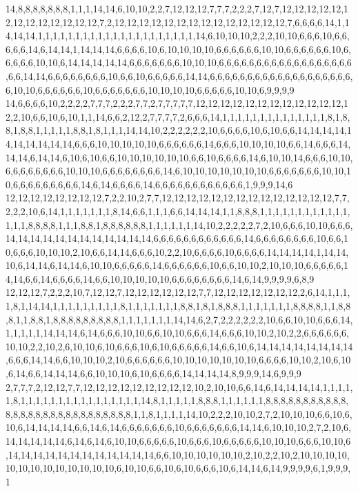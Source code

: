 14,8,8,8,8,8,8,8,1,1,1,14,14,6,10,10,2,2,7,12,12,12,7,7,7,2,2,2,7,12,7,12,12,12,12,12,12,12,12,12,12,12,12,12,7,2,12,12,12,12,12,12,12,12,12,12,12,12,12,12,7,6,6,6,6,14,1,14,14,14,1,1,1,1,1,1,1,1,1,1,1,1,1,1,1,1,1,1,1,1,1,14,6,10,10,10,2,2,2,10,10,6,6,6,10,6,6,6,6,6,14,6,14,14,1,14,14,14,6,6,6,6,10,6,10,10,10,10,6,6,6,6,6,6,10,10,6,6,6,6,6,6,10,6,6,6,6,6,10,10,6,14,14,14,14,14,6,6,6,6,6,6,6,10,10,10,6,6,6,6,6,6,6,6,6,6,6,6,6,6,6,6,6,6,6,6,14,14,6,6,6,6,6,6,6,6,10,6,6,10,6,6,6,6,6,14,14,6,6,6,6,6,6,6,6,6,6,6,6,6,6,6,6,6,6,6,6,10,10,6,6,6,6,6,6,10,6,6,6,6,6,6,6,10,10,10,10,6,6,6,6,6,10,10,6,9,9,9,9
14,6,6,6,6,10,2,2,2,2,7,7,7,2,2,2,7,7,2,7,7,7,7,7,12,12,12,12,12,12,12,12,12,12,12,12,12,2,10,6,6,10,6,10,1,1,14,6,6,2,12,2,7,7,7,7,2,6,6,6,14,1,1,1,1,1,1,1,1,1,1,1,1,1,1,8,1,8,8,1,8,8,1,1,1,1,1,8,8,1,8,1,1,1,14,14,10,2,2,2,2,2,2,10,6,6,6,6,10,6,10,6,6,14,14,14,14,14,14,14,14,14,14,6,6,6,10,10,10,10,10,6,6,6,6,6,6,14,6,6,6,10,10,10,10,6,6,14,6,6,6,14,14,14,6,14,14,6,10,6,10,6,6,10,10,10,10,10,10,6,6,10,6,6,6,6,14,6,10,10,14,6,6,6,10,10,6,6,6,6,6,6,6,6,10,10,10,6,6,6,6,6,6,6,6,14,6,10,10,10,10,10,10,10,6,6,6,6,6,6,6,10,10,10,6,6,6,6,6,6,6,6,6,14,6,14,6,6,6,6,14,6,6,6,6,6,6,6,6,6,6,6,6,1,9,9,9,14,6
12,12,12,12,12,12,12,12,7,2,2,10,2,7,7,12,12,12,12,12,12,12,12,12,12,12,12,12,12,7,7,2,2,2,10,6,14,1,1,1,1,1,1,1,8,14,6,6,1,1,1,6,6,14,14,14,1,1,8,8,8,1,1,1,1,1,1,1,1,1,1,1,1,1,1,1,8,8,8,8,1,1,1,8,8,1,8,8,8,8,8,8,1,1,1,1,1,1,14,10,2,2,2,2,2,7,2,10,6,6,6,10,10,6,6,6,14,14,14,14,14,14,14,14,14,14,14,14,6,6,6,6,6,6,6,6,6,6,6,6,14,6,6,6,6,6,6,6,6,10,6,6,10,6,6,6,10,10,10,2,10,6,6,14,14,6,6,6,10,2,2,10,6,6,6,6,10,6,6,6,6,14,14,14,14,1,14,14,10,6,14,14,6,14,14,6,10,10,6,6,6,6,6,14,6,6,6,6,6,6,10,6,6,10,10,2,10,10,10,6,6,6,6,6,14,14,6,6,14,6,6,6,6,14,6,6,10,10,10,10,10,6,6,6,6,6,6,6,6,14,6,14,9,9,9,9,6,8,9
12,12,12,7,2,2,2,10,7,12,12,7,12,12,12,12,12,12,7,7,12,12,12,12,12,12,12,2,6,14,1,1,1,1,8,1,14,14,1,1,1,1,1,1,1,1,1,8,1,1,1,1,1,1,1,8,8,1,8,1,8,8,8,1,1,1,1,1,1,1,8,8,8,8,1,1,8,8,8,1,1,8,8,1,8,8,8,8,8,8,8,8,8,1,1,1,1,1,1,1,14,14,6,2,7,2,2,2,2,2,2,10,6,6,10,10,6,6,6,14,1,1,1,1,1,14,14,14,6,14,6,6,6,10,10,6,6,10,10,6,6,6,14,6,6,6,10,10,2,10,2,2,6,6,6,6,6,6,10,10,2,2,10,2,6,10,10,6,10,6,6,6,10,6,10,6,6,6,6,6,14,6,6,10,6,14,14,14,14,14,14,14,14,6,6,6,14,14,6,6,10,10,10,2,10,6,6,6,6,6,6,10,10,10,10,10,10,10,6,6,6,6,10,10,2,10,6,10,6,14,6,6,14,14,14,6,6,10,10,10,6,10,6,6,6,6,14,14,14,14,8,9,9,9,14,6,9,9,9
2,7,7,7,2,12,12,7,7,12,12,12,12,12,12,12,12,12,10,2,10,10,6,6,14,6,14,14,14,14,1,1,1,1,1,8,1,1,1,1,1,1,1,1,1,1,1,1,1,1,1,1,14,8,1,1,1,1,1,8,8,8,1,1,1,1,1,1,8,8,8,8,8,8,8,8,8,8,8,8,8,8,8,8,8,8,8,8,8,8,8,8,8,8,8,8,1,1,8,1,1,1,1,14,10,2,2,2,10,10,2,7,2,10,10,10,6,6,10,6,10,6,14,14,14,14,6,6,14,6,14,6,6,6,6,6,6,6,10,6,6,6,6,6,6,6,14,14,6,10,10,10,2,7,2,10,6,14,14,14,14,14,6,14,6,14,6,10,10,6,6,6,6,6,10,6,6,6,10,6,6,6,6,6,10,10,10,6,6,6,10,10,6,14,14,14,14,14,14,14,14,14,14,14,14,6,6,10,10,10,10,10,10,2,10,2,2,10,2,10,10,10,10,10,10,10,10,10,10,10,10,10,6,10,10,6,6,10,6,10,6,6,6,10,6,14,14,6,14,9,9,9,9,6,1,9,9,9,1
